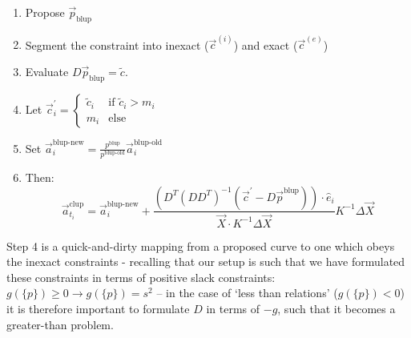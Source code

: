 \documentclass[]{article}
\def\ai{\vec{a}_{t_i}}
\begin{document}
			\begin{enumerate}
				\item Propose $\vec{p}_\text{blup}$
				\item Segment the constraint into inexact ($\vec{c}^{(i)}$) and exact ($\vec{c}^(e)$)
				\item Evaluate $D \vec{p}_\text{blup} = \tilde{c}$. 
				\item Let $\vec{c}^\prime_i = \begin{cases} 
					\tilde{c}_i & \text{if } \tilde{c}_i > m_i
					\\
					m_i & \text{else}
				\end{cases}$
				\item Set $\vec{a}_i^\text{blup-new} = \frac{p^\text{blup}}{p^\text{blup-old}} \vec{a}_i^\text{blup-old}$
				\item Then:
				$$ \ai^\text{clup} = \vec{a}_i^\text{blup-new} +  \frac{\left(D^T \left(D D^T \right)^{-1} \left(\vec{c}^\prime - D \vec{p}^\text{blup}\right)\right)\cdot \hat{e}_i}{\vec{X} \cdot K^{-1} \Delta\vec{X}} K^{-1} \Delta\vec{X}$$
			\end{enumerate}
			Step 4 is a quick-and-dirty mapping from a proposed curve to one which obeys the inexact constraints - recalling that our setup is such that we have formulated these constraints in terms of positive slack constraints: $g(\{p\}) \geq 0 \to g(\{p\}) = s^2$ -- in the case of `less than relations' ($g(\{p\})<0$) it is therefore important to formulate $D$ in terms of $-g$, such that it becomes a greater-than problem.
\end{document}
